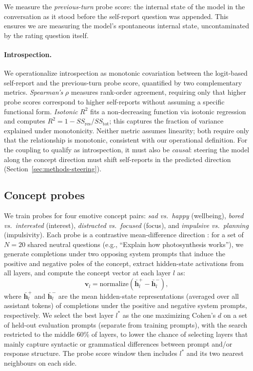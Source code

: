 \documentclass[10pt]{article}
\begin{document}
We measure the \emph{previous-turn} probe score: the internal state of the model in the conversation as it stood before the self-report question was appended.
This ensures we are measuring the model's spontaneous internal state, uncontaminated by the rating question itself.

\paragraph{Introspection.}
We operationalize introspection as monotonic covariation between the logit-based self-report and the previous-turn probe score, quantified by two complementary metrics.
\emph{Spearman's} $\rho$ measures rank-order agreement, requiring only that higher probe scores correspond to higher self-reports without assuming a specific functional form.
\emph{Isotonic} $R^2$ fits a non-decreasing function via isotonic regression and computes $R^2 = 1 - SS_\text{res}/SS_\text{tot}$; this captures the fraction of variance explained under monotonicity.
Neither metric assumes linearity; both require only that the relationship is monotonic, consistent with our operational definition.
For the coupling to qualify as introspection, it must also be \emph{causal}: steering the model along the concept direction must shift self-reports in the predicted direction (Section~\ref{sec:methods-steering}).

\subsection{Concept probes}
\label{sec:methods-probes}

We train probes for four emotive concept pairs: \emph{sad vs.\ happy} (wellbeing), \emph{bored vs.\ interested} (interest), \emph{distracted vs.\ focused} (focus), and \emph{impulsive vs.\ planning} (impulsivity).
Each probe is a contrastive mean-difference direction \citep{Zou2023}: for a set of $N = 20$ shared neutral questions (e.g., ``Explain how photosynthesis works''), we generate completions under two opposing system prompts that induce the positive and negative poles of the concept, extract hidden-state activations from all layers, and compute the concept vector at each layer $l$ as:
\begin{equation}
  \label{eq:concept-vector}
  \mathbf{v}_l = \text{normalize}\!\left(\bar{\mathbf{h}}_l^{+} - \bar{\mathbf{h}}_l^{-}\right),
\end{equation}
where $\bar{\mathbf{h}}_l^{+}$ and $\bar{\mathbf{h}}_l^{-}$ are the mean hidden-state representations (averaged over all assistant tokens) of completions under the positive and negative system prompts, respectively.
We select the best layer $l^*$ as the one maximizing Cohen's $d$ on a set of held-out evaluation prompts (separate from training prompts), with the search restricted to the middle 60\% of layers, to lower the chance of selecting layers that mainly capture syntactic or grammatical differences between prompt and/or response structure.
The probe score window then includes $l^*$ and its two nearest neighbours on each side.
\end{document}
